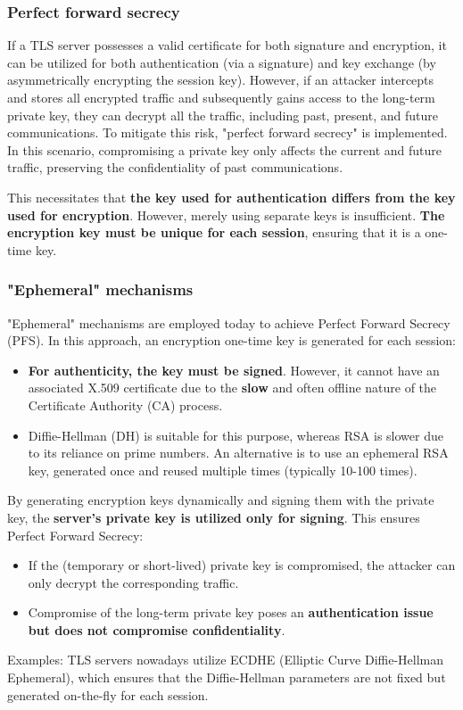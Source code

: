\subsubsection{Perfect forward secrecy}
If a TLS server possesses a valid certificate for both signature and encryption, it can be utilized for both authentication (via a signature) and key exchange (by asymmetrically encrypting the session key). However, if an attacker intercepts and stores all encrypted traffic and subsequently gains access to the long-term private key, they can decrypt all the traffic, including past, present, and future communications. To mitigate this risk, "perfect forward secrecy" is implemented. In this scenario, compromising a private key only affects the current and future traffic, preserving the confidentiality of past communications.

This necessitates that \textbf{the key used for authentication differs from the key used for encryption}.
However, merely using separate keys is insufficient. \textbf{The encryption key must be unique for each session}, ensuring that it is a one-time key.

\subsubsection{"Ephemeral" mechanisms}
"Ephemeral" mechanisms are employed today to achieve Perfect Forward Secrecy (PFS). In this approach, an encryption one-time key is generated for each session:
\begin{itemize}
	\item \textbf{For authenticity, the key must be signed}. However, it cannot have an associated X.509 certificate due to the \textbf{slow} and often offline nature of the Certificate Authority (CA) process.
	\item Diffie-Hellman (DH) is suitable for this purpose, whereas RSA is slower due to its reliance on prime numbers. An alternative is to use an ephemeral RSA key, generated once and reused multiple times (typically 10-100 times).
\end{itemize}

By generating encryption keys dynamically and signing them with the private key, the \textbf{server's private key is utilized only for signing}. This ensures Perfect Forward Secrecy:
\begin{itemize}
	\item If the (temporary or short-lived) private key is compromised, the attacker can only decrypt the corresponding traffic.
	\item Compromise of the long-term private key poses an \textbf{authentication issue but does not compromise confidentiality}.
\end{itemize}
Examples: TLS servers nowadays utilize ECDHE (Elliptic Curve Diffie-Hellman Ephemeral), which ensures that the Diffie-Hellman parameters are not fixed but generated on-the-fly for each session.


